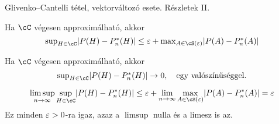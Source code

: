 \documentclass[aspectratio=169,notheorems,9pt,\option]{beamer}
\begin{document}
\begin{frame}{Glivenko--Cantelli tétel, vektorváltozó esete. Részletek II.}
  \begin{proposition}
    Ha $\cC$ végesen approximálható, akkor
    \begin{displaymath}\textstyle
      \sup_{H\in\cC}\abs*{P (H)-P^*_n (H)}\leq
      \eps + \max_{A\in\cS (\eps)}  \abs*{P(A)-P^*_n (A)}
    \end{displaymath}
  \end{proposition}
  \begin{corollary}
    Ha $\cC$ végesen approximálható, akkor
    \begin{displaymath}\textstyle
      \sup_{H\in\cC}\abs*{P(H)-P^*_n (H)} %
    \to0,\quad\text{egy valószínűséggel.}
    \end{displaymath}
  \end{corollary}
  \continue
  \begin{displaymath}
    \limsup_{n\to\infty}\sup_{H\in\cC}\abs*{P (H)-P^*_n (H)}
    \leq \eps+\lim_{n\to\infty}\max_{A\in\cS (\eps)}  \abs*{P (A)-P^*_n (A)}=\eps
  \end{displaymath}
  Ez minden $\varepsilon>0$-ra igaz, azaz a $\limsup$ nulla és a limesz is az.
\end{frame}
\end{document}
